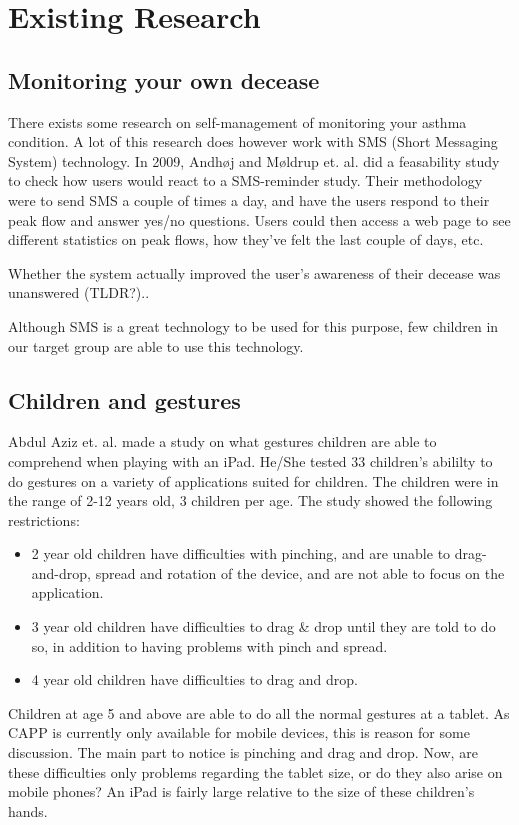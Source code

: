 \section{Existing Research}
\label{sec:existing-research}

\subsection{Monitoring your own decease}
There exists some research on self-management of monitoring your asthma condition. A lot of this research does however work with SMS (Short Messaging System) technology. In 2009, Andhøj and Møldrup et. al.\cite{anhoj2004feasibility} did a feasability study to check how users would react to a SMS-reminder study. Their methodology were to send SMS a couple of times a day, and have the users respond to their peak flow and answer yes/no questions. Users could then access a web page to see different statistics on peak flows, how they've felt the last couple of days, etc.


Whether the system actually improved the user's awareness of their decease was unanswered (TLDR?).. 

Although SMS is a great technology to be used for this purpose, few children in our target group are able to use this technology. 


\subsection{Children and gestures}

Abdul Aziz et. al. \cite{aziz2013children} made a study on what gestures children are able to comprehend when playing with an iPad. He/She tested 33 children's abililty to do gestures on a variety of applications suited for children. The children were in the range of 2-12 years old, 3 children per age. The study showed the following restrictions:

\begin{itemize}
  \item 2 year old children have difficulties with pinching, and are unable to drag-and-drop, spread and rotation of the device, and are not able to focus on the application. 
  \item 3 year old children have difficulties to drag \& drop until they are told to do so, in addition to having problems with pinch and spread. 
  \item 4 year old children have difficulties to drag and drop. 
\end{itemize}
Children at age 5 and above are able to do all the normal gestures at a tablet. As CAPP is currently only available for mobile devices, this is reason for some discussion. The main part to notice is pinching and drag and drop. Now, are these difficulties only problems regarding the tablet size, or do they also arise on mobile phones? An iPad is fairly large relative to the size of these children's hands. 